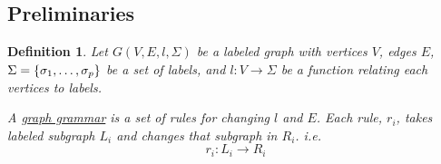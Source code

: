 \documentclass[]{article}
\numberwithin{equation}{section}
\newtheorem{definition}{Definition}
\begin{document}
\subsection*{Preliminaries}

\begin{definition}
    Let $G(V,E, l, \Sigma)$ be a labeled graph with vertices $V$, edges $E$, $\Sigma = \qty{\sigma_1, \dots, \sigma_p}$ be a set of labels, and $l : V \to \Sigma$ be a function relating each vertices to labels.

    A \emph{\underline{graph grammar}} is a set of rules for changing $l$ and $E$. 
    Each rule, $r_i$, takes labeled subgraph $L_i$ and changes that subgraph in $R_i$. 
    i.e. \[
        r_i : L_i \longrightarrow R_i
    \]
\end{definition}


\end{document}
